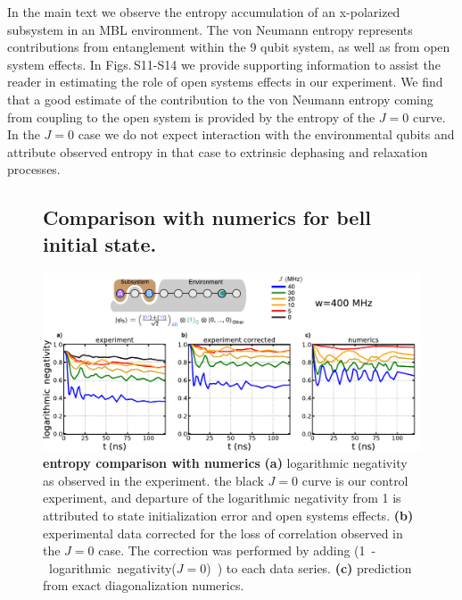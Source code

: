 In the main text we observe the entropy accumulation of an x-polarized subsystem in an MBL environment.
The von Neumann entropy represents contributions from entanglement within the 9 qubit system, as well as from open system effects.  In Figs.\,S11-S14 we provide supporting information to assist the reader in estimating the role of open systems effects in our experiment.  We find that a good estimate of the contribution to the von Neumann entropy coming from coupling to the open system is provided by the entropy of the $J=0$ curve.  In the $J=0$ case we do not expect interaction with the environmental qubits and attribute observed entropy in that case to extrinsic dephasing and relaxation processes.

\begin{figure}[tbh]
\subsection{Comparison with numerics for bell initial state.}
\centering
\includegraphics[width=140mm, keepaspectratio]{./PDF/dat_cor_num_bell_linear.pdf}
\caption{\textbf{entropy comparison with numerics}
\textbf{(a)} logarithmic negativity as observed in the experiment.
the black $J=0$ curve is our control experiment, and departure of the logarithmic negativity from 1 is attributed to state initialization error and open systems effects.
\textbf{(b)} experimental data corrected for the loss of correlation observed in the $J=0$ case.  The correction was performed by adding \mbox{(1 - logarithmic negativity($J=0$) )} to each data series.
\textbf{(c)} prediction from exact diagonalization numerics.
}
\end{figure}

